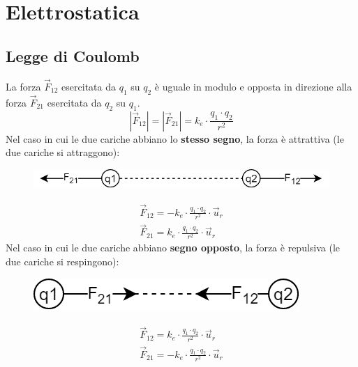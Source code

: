 \chapter{Elettrostatica}

\section{Legge di Coulomb}
  
La forza $\vec{F}_{12}$ esercitata da $q_1$ su $q_2$ è uguale in modulo e opposta in direzione alla forza $\vec{F}_{21}$ esercitata da $q_2$ su $q_1$.
    \begin{displaymath}
    	|\vec{F}_{12}| = |\vec{F}_{21}| = k_e \cdot \frac{q_1 \cdot q_2}{r^2}
    \end{displaymath}
Nel caso in cui le due cariche abbiano lo \textbf{stesso segno}, la forza è attrattiva (le due cariche si attraggono):
	\begin{figure}[h!]
      \centering
      \includegraphics[scale=0.4]{esempio1}
  \end{figure}
  	\begin{displaymath}\begin{aligned}
    	\vec{F}_{12} = - k_e \cdot \frac{q_1 \cdot q_2}{r^2} \cdot \vec{u}_r\\
        \vec{F}_{21} = k_e \cdot \frac{q_1 \cdot q_2}{r^2} \cdot \vec{u}_r
    \end{aligned}\end{displaymath}
Nel caso in cui le due cariche abbiano \textbf{segno opposto}, la forza è repulsiva (le due cariche si respingono):
    \begin{figure}[h!]
    	\centering
        \includegraphics[scale=0.4]{esempio2.png}
	\end{figure}
    \begin{displaymath}\begin{aligned}
        \vec{F}_{12} = k_e \cdot \frac{q_1 \cdot q_2}{r^2} \cdot \vec{u}_r\\
        \vec{F}_{21} = - k_e \cdot \frac{q_1 \cdot q_2}{r^2} \cdot \vec{u}_r
    \end{aligned}\end{displaymath}
    
